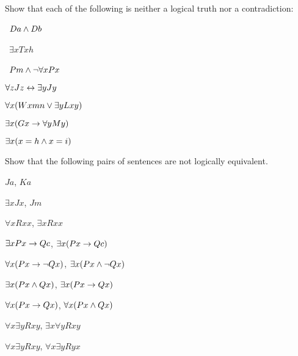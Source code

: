 \practiceproblems

\solutions
\problempart
\label{pr.Contingent}
Show that each of the following is neither a logical truth nor a contradiction:
\begin{earg}
\item \leftsolutions\ $Da \wedge Db$
\item \leftsolutions\ $\exists x Txh$
\item \leftsolutions\ $Pm \wedge \neg\forall x Px$
\item $\forall z Jz \leftrightarrow \exists y Jy$
\item $\forall x (Wxmn \vee \exists yLxy)$
\item $\exists x (Gx \rightarrow \forall y My)$
\item $\exists x (x = h \wedge x = i)$
\end{earg}

\solutions
\problempart
\label{pr.NotEquiv}
Show that the following pairs of sentences are not logically equivalent.
\begin{earg}
\item $Ja$, $Ka$
\item $\exists x Jx$, $Jm$
\item $\forall x Rxx$, $\exists x Rxx$
\item $\exists x Px \rightarrow Qc$, $\exists x (Px \rightarrow Qc)$
\item $\forall x(Px \rightarrow \neg Qx)$, $\exists x(Px \wedge \neg Qx)$
\item $\exists x(Px \wedge Qx)$, $\exists x(Px \rightarrow Qx)$
\item $\forall x(Px\rightarrow Qx)$, $\forall x(Px \wedge Qx)$
\item $\forall x\exists y Rxy$, $\exists x\forall y Rxy$
\item $\forall x\exists y Rxy$, $\forall x\exists y Ryx$
\end{earg}



